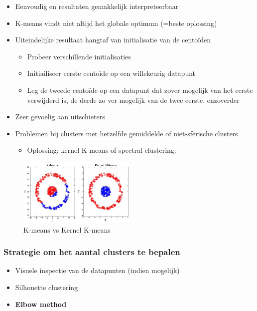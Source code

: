 \documentclass{article}
\begin{document}
\begin{itemize}
    \item Eenvoudig en resultaten gemakkelijk interpreteerbaar
    \item K-means vindt niet altijd het globale optimum (=beste oplossing)
    \item Uiteindelijke resultaat hangtaf van initialisatie van de centoïden
    \begin{itemize}
        \item Probeer verschillende initialisaties
        \item Initiailiseer eerste centoïde op een willekeurig datapunt
        \item Leg de tweede centoïde op een datapunt dat zover mogelijk van het eerste verwijderd is, de derde zo ver mogelijk van de twee eerste, enzoverder
    \end{itemize}
    \item Zeer gevoelig aan uitschieters
    \item Problemen bij clusters met hetzelfde gemiddelde of niet-sferische clusters
    \begin{itemize}
        \item Oplossing: kernel K-means of spectral clustering:
    \end{itemize}
\end{itemize}

\begin{figure}[H]
    \centering
    \includegraphics[width=0.5\textwidth]{k-means-kernel.png}
    \caption{K-means vs Kernel K-means}
\end{figure}

\subsubsection{Strategie om het aantal clusters te bepalen}

\begin{itemize}
    \item Visuele inspectie van de datapunten (indien mogelijk)
    \item Silhouette clustering
    \item \textbf{Elbow method}
\end{itemize}
\end{document}
